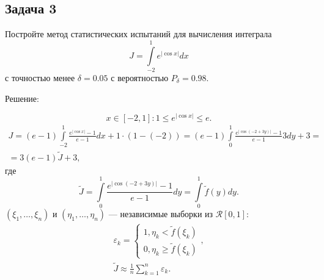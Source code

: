 \documentclass[a4paper,12pt]{article}
\newcommand{\modulus}[1]{\left | #1 \right |}
\newcommand{\expectation}[1]{\mathtt{M} \left[ #1 \right]}
\newcommand{\variance}[1]{\mathtt{D} \left[ #1 \right]}
\newif\ifsolutions
\begin{document}
\ifsolutions
    Решение:

    $(\xi_1, \dots, \xi_n)$ --- выборка из $E(5)$, $(\varphi_1, \dots, \varphi_n)$ --- выборка из $\mathcal{N} (0, 1)$, оценка:
    \begin{gather*}
        \eta_k = e^{- 2 \modulus{\xi_k}} \arctg \varphi_k , \\
        \expectation{\eta} \approx \frac{1}{n} \sum_{k=1}^n \eta_k .
    \end{gather*}
    Требуемый объём выборок:
    \[
        n
        \ge \overline{n}_\delta
        = \left( \Phi^{-1} \left( \frac{1 + P_\delta}{2} \right) \right)^2 \frac{\overline{D}}{\delta^2} ,
    \]
    где
    \begin{gather*}
        - \frac{\pi}{2} \le e^{-2 \modulus{\xi_k}} \arctg \varphi \le \frac{\pi}{2}, \\
        \variance{\eta_k}
        \le \left( \frac{\frac{\pi}{2} - \left(-\frac{\pi}{2}\right)}{2} \right)^2
        = \left( \frac{\pi}{2} \right)^2
        \approx 2.4675
        = \overline{D} ,
    \end{gather*}
    тогда
    \[
        \overline{n}
        = \left( \Phi^{-1} \left( 0.995 \right) \right)^2 \frac{2.4675}{10^{-4}}
        \approx 2.5758^2 \cdot 2.4675 \cdot 10^4
        \approx 16.3712 \cdot 10^4
        = 163 712 .
    \]
\fi

\subsection*{Задача 3}

Постройте метод статистических испытаний для вычисления интеграла
\[
    J = \int \limits_{-2}^{1} e^{\modulus{\cos x}} dx
\]
с точностью менее $\delta = 0.05$ с вероятностью $P_\delta = 0.98$.

\ifsolutions
    Решение:

    \[
        x \in [-2, 1]: 1 \le e^{\modulus{\cos x}} \le e .
    \]
    \begin{multline*}
        J
        = (e-1) \int \limits_{-2}^{1} \frac{e^{\modulus{\cos x}} - 1}{e-1} dx + 1 \cdot (1 - (-2))
        = (e-1) \int \limits_{0}^{1} \frac{e^{\modulus{\cos (-2 + 3 y)}} - 1}{e-1} 3 dy + 3 = \\
        = 3 (e-1) \widetilde{J} + 3 ,
    \end{multline*}
    где
    \[
        \widetilde{J}
        = \int \limits_{0}^{1} \frac{e^{\modulus{\cos (-2 + 3 y)}} - 1}{e-1} dy
        = \int \limits_{0}^{1} \widetilde{f}(y) dy .
    \]
    $(\xi_1, \dots, \xi_n)$ и $(\eta_1, \dots, \eta_n)$ --- независимые выборки из $\mathcal{R} [0, 1]$:
    \begin{gather*}
        \varepsilon_k = \left \{
        \begin{array}{ll}
            1, \eta_k < \widetilde{f}(\xi_k) \\
            0, \eta_k \ge \widetilde{f}(\xi_k)
        \end{array}
        \right . , \\
        \widetilde{J} \approx \frac{1}{n} \sum_{k=1}^n \varepsilon_k .
    \end{gather*}
\end{document}
